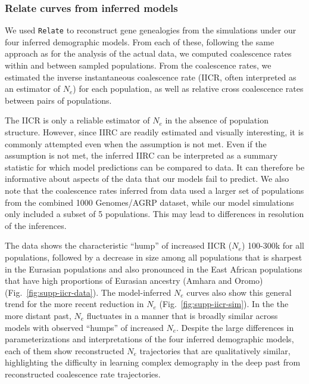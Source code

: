 \documentclass[]{article}
\newcommand{\Relate}{\texttt{Relate}\xspace}
\begin{document}
\subsubsection{Relate curves from inferred models}

We used \Relate \citep{Speidel2019-nj} to reconstruct gene genealogies from the
simulations under our four inferred demographic models. From each of these,
following the same approach as for the analysis of the actual data, we computed
coalescence rates within and between sampled populations. From the coalescence
rates, we estimated the inverse instantaneous coalescence rate (IICR, often
interpreted as an estimator of $N_e$) for each population, as well as relative
cross coalescence rates between pairs of populations.

The IICR is only a reliable estimator of $N_e$ in the absence of population structure.
However, since IIRC are readily estimated and visually interesting,
it is commonly attempted even when the assumption is not met.
Even if the assumption is not met, the inferred IIRC can be interpreted as a
summary statistic for which model predictions can be compared to data.
It can therefore be
informative about aspects of the data that our models fail to predict.
We also note that the coalescence rates inferred from data used a larger set of
populations from the combined 1000 Genomes/AGRP dataset, while our model
simulations only included a subset of 5 populations. This may lead to
differences in resolution of the inferences.

The data shows the characteristic ``hump'' of increased IICR ($N_e$) 100-300k
for all populations, followed by a decrease in size among all populations that
is sharpest in the Eurasian populations and also pronounced in the East African
populations that have high proportions of Eurasian ancestry (Amhara and Oromo)
(Fig.~\ref{fig:supp-iicr-data}). The model-inferred $N_e$ curves also show this
general trend for the more recent reduction in $N_e$
(Fig.~\ref{fig:supp-iicr-sim}). In the the more distant past, $N_e$ fluctuates
in a manner that is broadly similar across models with observed ``humps'' of
increased $N_e$. Despite the large differences in parameterizations and
interpretations of the four inferred demographic models, each of them show
reconstructed $N_e$ trajectories that are qualitatively similar, highlighting
the difficulty in learning complex demography in the deep past from
reconstructed coalescence rate trajectories.
\end{document}
